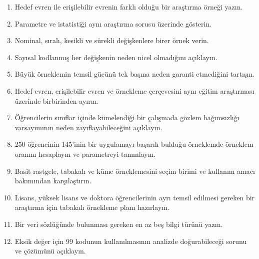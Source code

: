 \begin{enumerate}
  \item Hedef evren ile erişilebilir evrenin farklı olduğu bir araştırma örneği yazın.
  \item Parametre ve istatistiği aynı araştırma sorusu üzerinde gösterin.
  \item Nominal, sıralı, kesikli ve sürekli değişkenlere birer örnek verin.
  \item Sayısal kodlanmış her değişkenin neden nicel olmadığını açıklayın.
  \item Büyük örneklemin temsil gücünü tek başına neden garanti etmediğini tartışın.
  \item Hedef evren, erişilebilir evren ve örnekleme çerçevesini aynı eğitim
  araştırması üzerinde birbirinden ayırın.
  \item Öğrencilerin sınıflar içinde kümelendiği bir çalışmada gözlem
  bağımsızlığı varsayımının neden zayıflayabileceğini açıklayın.
  \item 250 öğrencinin 145'inin bir uygulamayı başarılı bulduğu örneklemde
  örneklem oranını hesaplayın ve parametreyi tanımlayın.
  \item Basit rastgele, tabakalı ve küme örneklemesini seçim birimi ve kullanım
  amacı bakımından karşılaştırın.
  \item Lisans, yüksek lisans ve doktora öğrencilerinin ayrı temsil edilmesi
  gereken bir araştırma için tabakalı örnekleme planı hazırlayın.
  \item Bir veri sözlüğünde bulunması gereken en az beş bilgi türünü yazın.
  \item Eksik değer için 99 kodunun kullanılmasının analizde doğurabileceği
  sorunu ve çözümünü açıklayın.
\end{enumerate}